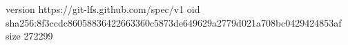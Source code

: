 version https://git-lfs.github.com/spec/v1
oid sha256:8f3ccdc86058836422663360c5873de649629a2779d021a708bc0429424853af
size 272299
